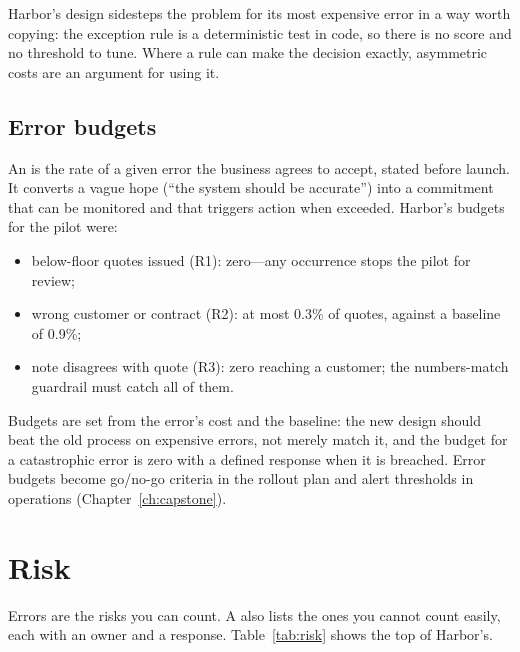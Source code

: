 Harbor's design sidesteps the problem for its most expensive error in a way worth copying: the exception rule is a deterministic test in code, so there is no score and no threshold to tune. Where a rule can make the decision exactly, asymmetric costs are an argument for using it.

\subsection{Error budgets}

An  is the rate of a given error the business agrees to accept, stated before launch. It converts a vague hope (``the system should be accurate'') into a commitment that can be monitored and that triggers action when exceeded. Harbor's budgets for the pilot were:
\begin{itemize}[itemsep=1pt]
  \item below-floor quotes issued (\textsf{R1}): zero---any occurrence stops the pilot for review;
  \item wrong customer or contract (\textsf{R2}): at most 0.3\% of quotes, against a baseline of 0.9\%;
  \item note disagrees with quote (\textsf{R3}): zero reaching a customer; the numbers-match guardrail must catch all of them.
\end{itemize}
Budgets are set from the error's cost and the baseline: the new design should beat the old process on expensive errors, not merely match it, and the budget for a catastrophic error is zero with a defined response when it is breached. Error budgets become go/no-go criteria in the rollout plan and alert thresholds in operations (Chapter~\ref{ch:capstone}).

\section{Risk}
\label{sec:risk}

Errors are the risks you can count. A  also lists the ones you cannot count easily, each with an owner and a response. Table~\ref{tab:risk} shows the top of Harbor's.

